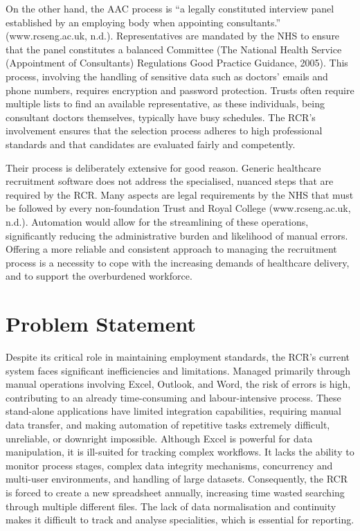 On the other hand, the AAC process is “a legally constituted interview panel established by an employing body when appointing consultants.” (www.rcseng.ac.uk, n.d.). Representatives are mandated by the NHS to ensure that the panel constitutes a balanced Committee (The National Health Service (Appointment of Consultants) Regulations Good Practice Guidance, 2005). This process, involving the handling of sensitive data such as doctors' emails and phone numbers, requires encryption and password protection. Trusts often require multiple lists to find an available representative, as these individuals, being consultant doctors themselves, typically have busy schedules. The RCR’s involvement ensures that the selection process adheres to high professional standards and that candidates are evaluated fairly and competently.

Their process is deliberately extensive for good reason. Generic healthcare recruitment software does not address the specialised, nuanced steps that are required by the RCR. Many aspects are legal requirements by the NHS that must be followed by every non-foundation Trust and Royal College (www.rcseng.ac.uk, n.d.). Automation would allow for the streamlining of these operations, significantly reducing the administrative burden and likelihood of manual errors. Offering a more reliable and consistent approach to managing the recruitment process is a necessity to cope with the increasing demands of healthcare delivery, and to support the overburdened workforce.
\section{Problem Statement}
Despite its critical role in maintaining employment standards, the RCR's current system faces significant inefficiencies and limitations. Managed primarily through manual operations involving Excel, Outlook, and Word, the risk of errors is high, contributing to an already time-consuming and labour-intensive process. These stand-alone applications have limited integration capabilities, requiring manual data transfer, and making automation of repetitive tasks extremely difficult, unreliable, or downright impossible. Although Excel is powerful for data manipulation, it is ill-suited for tracking complex workflows. It lacks the ability to monitor process stages, complex data integrity mechanisms, concurrency and multi-user environments, and handling of large datasets. Consequently, the RCR is forced to create a new spreadsheet annually, increasing time wasted searching through multiple different files. The lack of data normalisation and continuity makes it difficult to track and analyse specialities, which is essential for reporting.

